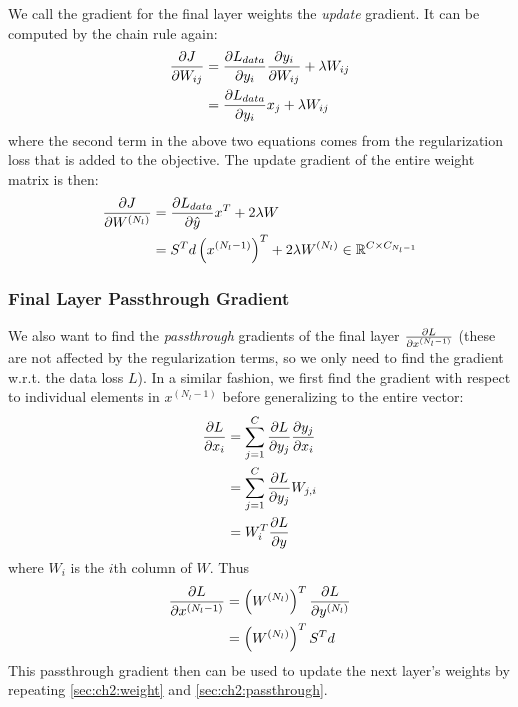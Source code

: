 We call the gradient for the final layer weights the \emph{update} gradient.
It can be computed by the chain rule again:
\begin{align}
  \dydx{J}{W_{ij}} &= \dydx{L_{data}}{y_i} \dydx{y_i}{W_{ij}} + \lambda W_{ij} \\
                   &= \dydx{L_{data}}{y_i} x_j + \lambda W_{ij}
\end{align}
where the second term in the above two equations comes from the regularization
loss that is added to the objective. The update gradient of the entire weight matrix is
then:
\begin{align}
  \dydx{J}{W^{(N_l)}} &= \dydx{L_{data}}{\hat{y}} x^T +2\lambda W \\
                    &= S^T d \left(x^{(N_l-1)}\right)^T + 2\lambda W^{(N_l)} \in \reals[C \x C_{N_l-1}]
\end{align}

\subsubsection{Final Layer Passthrough Gradient} \label{sec:ch2:passthrough}
We also want to find the \emph{passthrough} gradients of the final
layer $\dydx{L}{x^{(N_l-1)}}$ (these are not affected by the regularization
terms, so we only need to find the gradient w.r.t. the data loss $L$). In a
similar fashion, we first find the gradient with respect to individual elements
in $x^{(N_l-1)}$ before generalizing to the entire vector:
\begin{align}
  \dydx{L}{x_i} &= \sum_{j=1}^{C} \dydx{L}{y_j} \dydx{y_j}{x_i} \\
                &= \sum_{j=1}^{C} \dydx{L}{y_j} W_{j,i} \\
                &= W_{i}^T\dydx{L}{y} \\
\end{align}
where $W_i$ is the $i$th column of $W$. Thus
\begin{align}
  \dydx{L}{x^{(N_l-1)}} &= \left(W^{(N_l)}\right)^T \dydx{L}{y^{(N_l)}} \\
                      &= \left( W^{(N_l)} \right)^T S^T d
\end{align}
This passthrough gradient then can be used to update the next layer's weights by
repeating \autoref{sec:ch2:weight} and \autoref{sec:ch2:passthrough}.

